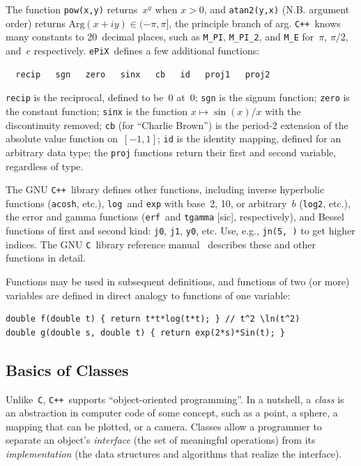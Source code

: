 \documentclass[12pt]{report}
\newcommand{\code}[1]{\texttt{#1}}
\newcommand{\ePiX}{\code{ePiX}}
\newcommand{\C}{\code{C}}
\newcommand{\CXX}{\code{C++}}
\begin{document}
The function \code{pow(x,y)} returns~$x^y$ when $x>0$, and
\code{atan2(y,x)} (N.B. argument order) returns
$\mathrm{Arg}(x+iy)\in(-\pi,\pi]$, the principle branch of arg.
\CXX~knows many constants to 20~decimal places, such as \code{M\_PI},
\code{M\_PI\_2}, and \code{M\_E} for~$\pi$, $\pi/2$, and~$e$
respectively.  \ePiX\ defines a few additional functions:
\begin{verbatim}
  recip   sgn   zero   sinx   cb   id   proj1   proj2
\end{verbatim}
\begin{center}
  \qquad
  \qquad
  
\end{center}
\code{recip} is the reciprocal, defined to be~$0$ at~$0$; \code{sgn}
is the signum function; \code{zero} is the constant function;
\code{sinx} is the function $x\mapsto \sin(x)/x$ with the
discontinuity removed; \code{cb} (for ``Charlie Brown'') is the
period-2 extension of the absolute value function on~$[-1,1]$;
\code{id} is the identity mapping, defined for an arbitrary data type;
the \code{proj} functions return their first and second variable,
regardless of type.

The GNU \CXX\ library defines other functions, including inverse
hyperbolic functions (\code{acosh}, etc.), \code{log}~and \code{exp}
with base~2, 10, or arbitrary~$b$ (\code{log2}, etc.), the error and
gamma functions (\code{erf}~and \code{tgamma} [sic], respectively),
and Bessel functions of first and second kind: \code{j0}, \code{j1},
\code{y0}, etc. Use, e.g., \code{jn(5,\ )} to get higher indices.
The GNU \C~library reference manual~\cite{GNUC} describes these and other
functions in detail.

Functions may be used in subsequent definitions, and functions of two
(or more) variables are defined in direct analogy to functions of one
variable:
\begin{verbatim}
double f(double t) { return t*t*log(t*t); } // t^2 \ln(t^2)
double g(double s, double t) { return exp(2*s)*Sin(t); }
\end{verbatim}


\subsection*{Basics of Classes}

Unlike~\code{C}, \CXX\ supports ``object-oriented programming''. In a
nutshell, a \emph{class} is an abstraction in computer code of some
concept, such as a point, a sphere, a mapping that can be plotted, or
a camera. Classes allow a programmer to separate an object's
\emph{interface} (the set of meaningful operations) from its
\emph{implementation} (the data structures and algorithms that realize
the interface). 
\end{document}
